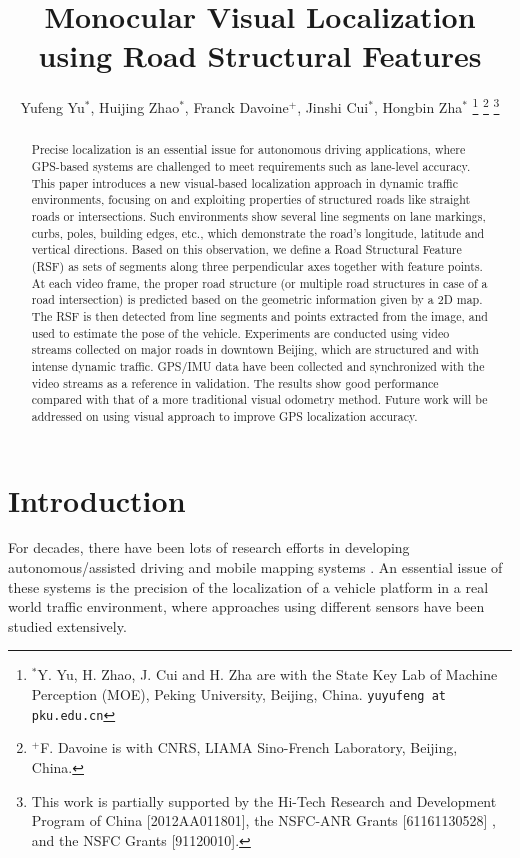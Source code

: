 \documentclass[letterpaper, 10 pt, conference]{ieeeconf}  %
\title{\LARGE \bf
Monocular Visual Localization using Road Structural Features
}
\author{Yufeng Yu$^{*}$, Huijing Zhao$^{*}$, Franck Davoine$^{+}$, Jinshi Cui$^{*}$, Hongbin Zha$^{*}$
\thanks{$^{*}$Y. Yu, H. Zhao, J. Cui and H. Zha are with the State Key Lab of Machine Perception (MOE), Peking University, Beijing, China. {\tt\small yuyufeng at pku.edu.cn}}
\thanks{$^{+}$F. Davoine is with CNRS, LIAMA Sino-French Laboratory, Beijing, China.}
\thanks{This work is partially supported by the Hi-Tech Research and Development Program of China [2012AA011801], the NSFC-ANR Grants [61161130528] , and the NSFC Grants [91120010].}
}
\begin{document}
\maketitle
\thispagestyle{empty}
\pagestyle{empty}


\begin{abstract}
Precise localization is an essential issue for autonomous driving applications, where GPS-based systems are challenged to meet requirements such as lane-level accuracy. This paper introduces a new visual-based localization approach in dynamic traffic environments, focusing on and exploiting properties of structured roads like straight roads or intersections. Such environments show several line segments on lane markings, curbs, poles, building edges, etc., which demonstrate the road's longitude, latitude and vertical directions. Based on this observation, we define a Road Structural Feature (RSF) as sets of segments along three perpendicular axes together with feature points. At each video frame, the proper road structure (or multiple road structures in case of a road intersection) is predicted based on the geometric information given by a 2D map. The RSF is then detected from line segments and points extracted from the image, and used to estimate the pose of the vehicle. Experiments are conducted using video streams collected on major roads in downtown Beijing, which are structured and with intense dynamic traffic. GPS/IMU data have been collected and synchronized with the video streams as a reference in validation. The results show good performance compared with that of a more traditional visual odometry method. Future work will be addressed on using visual approach to improve GPS localization accuracy.
\end{abstract}


\section{Introduction}
\label{sec_introduction}

For decades, there have been lots of research efforts in developing autonomous/assisted driving and mobile mapping systems \cite{urmson2008autonomous}. An essential issue of these systems is the precision of the localization of a vehicle platform in a real world traffic environment, where approaches using different sensors have been studied extensively.
\end{document}
